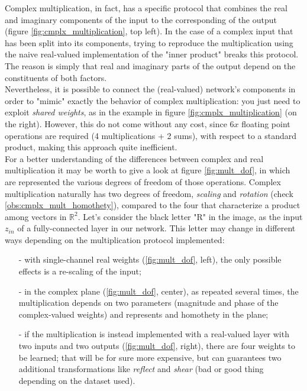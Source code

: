 \documentclass[../main.tex]{subfiles}
\begin{document}
Complex multiplication, in fact, has a specific protocol that combines the real and imaginary components of the input to the corresponding of the output (figure \ref{fig:cmplx_multiplication}, top left). In the case of a complex input that has been split into its components, trying to reproduce the multiplication using the naive real-valued implementation of the "inner product" breaks this protocol. The reason is simply that real and imaginary parts of the output depend on the constituents of both factors.\\
Nevertheless, it is possible to connect the (real-valued) network's components in order to "mimic" exactly the behavior of complex multiplication: you just need to exploit \textit{shared weights}, as in the example in figure \ref{fig:cmplx_multiplication} (on the right). However, this do not come without any cost, since $6x$ floating point operations are required (4 multiplications + 2 sums), with respect to a standard product, making this approach quite inefficient.\\
For a better understanding of the differences between complex and real multiplication it may be worth to give a look at figure \ref{fig:mult_dof}, in which are represented the various degrees of freedom of those operations. Complex multiplication naturally has two degrees of freedom, \textit{scaling} and \textit{rotation} (check \ref{obs:cmplx_mult_homothety}), compared to the four that characterize a product among vectors in $\mathds{R}^2$. Let's consider the black letter "R" in the image, as the input $z_{in}$ of a fully-connected layer in our network. This letter may change in different ways depending on the multiplication protocol implemented:
\begin{itemize}
	\item[-] with single-channel real weights (\ref{fig:mult_dof}, left), the only possible effects is a re-scaling of the input;
	\item[-] in the complex plane (\ref{fig:mult_dof}, center), as repeated several times, the multiplication depends on two parameters (magnitude and phase of the complex-valued weights) and represents and homothety in the plane;
	\item[-] if the multiplication is instead implemented with a real-valued layer with two inputs and two outputs (\ref{fig:mult_dof}, right), there are four weights to be learned; that will be for sure more expensive, but can guarantees two additional transformations like \textit{reflect} and \textit{shear} (bad or good thing depending on the dataset used).	
\end{itemize}
\end{document}
